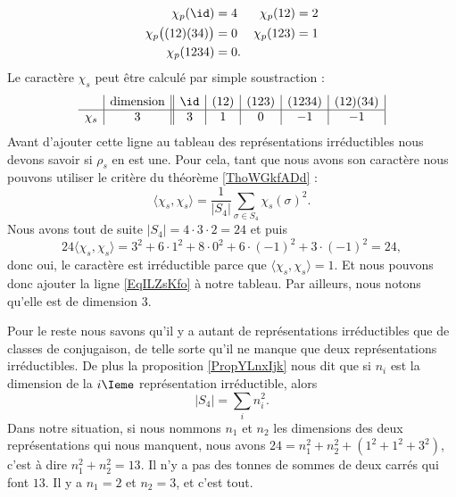 \begin{subequations}
    \begin{align}
    \chi_p(\id)&=4&\chi_p(12)&=2\\
    \chi_p\big( (12)(34) \big)&=0&\chi_p(123)&=1\\
    \chi_p(1234)&=0.
    \end{align}
\end{subequations}
Le caractère \( \chi_s\) peut être calculé par simple soustraction :
\begin{equation}   \label{EqILZsKfo}
    \begin{array}[]{c|c||c|c|c|c|c|}
        &\text{dimension}&\id&(12)&(123)&(1234)&(12)(34)\\
          \hline
          \chi_s&3&3&1&0&-1&-1\\ 
    \end{array}
\end{equation}
Avant d'ajouter cette ligne au tableau des représentations irréductibles nous devons savoir si \( \rho_s\) en est une. Pour cela, tant que nous avons son caractère nous pouvons utiliser le critère du théorème \ref{ThoWGkfADd} :
\begin{equation}
    \langle \chi_s, \chi_s\rangle =\frac{1}{ | S_4 | }\sum_{\sigma\in S_4}\chi_s(\sigma)^2.
\end{equation}
Nous avons tout de suite \( | S_4 |=4\cdot 3\cdot 2=24\) et puis
\begin{equation}
    24\langle \chi_s, \chi_s\rangle =3^2+6\cdot 1^2+8\cdot 0^2+6\cdot(-1)^2+3\cdot (-1)^2=24,
\end{equation}
donc oui, le caractère est irréductible parce que \( \langle \chi_s, \chi_s\rangle =1\). Et nous pouvons donc ajouter la ligne \eqref{EqILZsKfo} à notre tableau. Par ailleurs, nous notons qu'elle est de dimension \( 3\).

Pour le reste nous savons qu'il y a autant de représentations irréductibles que de classes de conjugaison, de telle sorte qu'il ne manque que deux représentations irréductibles. De plus la proposition \ref{PropYLnxIjk} nous dit que si \( n_i\) est la dimension de la \( i\Ieme\) représentation irréductible, alors
\begin{equation}
    | S_4 |=\sum_in_i^2.
\end{equation}
Dans notre situation, si nous nommons \( n_1\) et \( n_2\) les dimensions des deux représentations qui nous manquent, nous avons \( 24=n_1^2+n_2^2+(1^2+1^2+3^2)\), c'est à dire \( n_1^2+n_2^2=13\). Il n'y a pas des tonnes de sommes de deux carrés qui font \( 13\). Il y a \( n_1=2\) et \( n_2=3\), et c'est tout.

